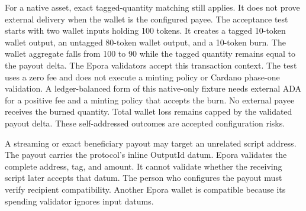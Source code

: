 \begin{description}[leftmargin=1.4em,style=nextline]
For a native asset, exact tagged-quantity matching still applies. It does not prove external delivery when the wallet is the configured payee. The acceptance test starts with two wallet inputs holding 100 tokens. It creates a tagged 10-token wallet output, an untagged 80-token wallet output, and a 10-token burn. The wallet aggregate falls from 100 to 90 while the tagged quantity remains equal to the payout delta. The Epora validators accept this transaction context. The test uses a zero fee and does not execute a minting policy or Cardano phase-one validation. A ledger-balanced form of this native-only fixture needs external ADA for a positive fee and a minting policy that accepts the burn. No external payee receives the burned quantity. Total wallet loss remains capped by the validated payout delta. These self-addressed outcomes are accepted configuration risks.
\item[External script payout compatibility.] A streaming or exact beneficiary payout may target an unrelated script address. The payout carries the protocol's inline $\mathrm{OutputId}$ datum. Epora validates the complete address, tag, and amount. It cannot validate whether the receiving script later accepts that datum. The person who configures the payout must verify recipient compatibility. Another Epora wallet is compatible because its spending validator ignores input datums.

\end{description}
